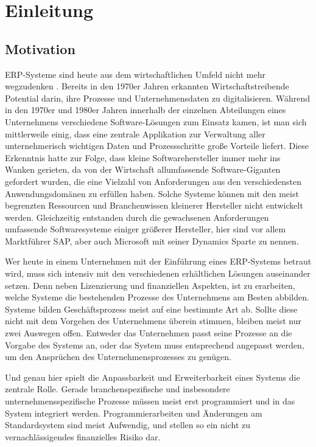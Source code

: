 \chapter{Einleitung}
\label{cha:Einleitung}

\section{Motivation}
\label{sec:Motivation}

ERP-Systeme sind heute aus dem wirtschaftlichen Umfeld nicht mehr wegzudenken \cite{WongTein2003} \cite{DuplagaMarzie2003}. Bereits in den 1970er Jahren erkannten Wirtschaftstreibende Potential darin, ihre Prozesse und Unternehmensdaten zu digitalisieren. Während in den 1970er und 1980er Jahren innerhalb der einzelnen Abteilungen eines Unternehmens verschiedene Software-Lösungen zum Einsatz kamen, ist man sich mittlerweile einig, dass eine zentrale Applikation zur Verwaltung aller unternehmerisch wichtigen Daten und Prozessschritte große Vorteile liefert. Diese Erkenntnis hatte zur Folge, dass kleine Softwarehersteller immer mehr ins Wanken gerieten, da von der Wirtschaft allumfassende Software-Giganten gefordert wurden, die eine Vielzahl von Anforderungen aus den verschiedensten Anwendungsdomänen zu erfüllen haben. Solche Systeme können mit den meist begrenzten Ressourcen und Branchenwissen kleinerer Hersteller nicht entwickelt werden. Gleichzeitig entstanden durch die gewachsenen Anforderungen umfassende Softwaresysteme einiger größerer Hersteller, hier sind vor allem Marktführer SAP, aber auch Microsoft mit seiner Dynamics Sparte zu nennen.

Wer heute in einem Unternehmen mit der Einführung eines ERP-Systems betraut wird, muss sich intensiv mit den verschiedenen erhältlichen Lösungen auseinander setzen\cite{WongTein2003}. Denn neben Lizenzierung und finanziellen Aspekten, ist zu erarbeiten, welche Systeme die bestehenden Prozesse des Unternehmens am Besten abbilden. Systeme bilden Geschäftsprozess meist auf eine bestimmte Art ab. Sollte diese nicht mit dem Vorgehen des Unternehmens überein stimmen, bleiben meist nur zwei Auswegen offen. Entweder das Unternehmen passt seine Prozesse an die Vorgabe des Systems an, oder das System muss entsprechend angepasst werden, um den Ansprüchen des Unternehmensprozesses zu genügen.

Und genau hier spielt die Anpassbarkeit und Erweiterbarkeit eines Systems die zentrale Rolle. Gerade branchenspezifische und insbesondere unternehmensspezifische Prozesse müssen meist erst programmiert und in das System integriert werden. Programmierarbeiten und Änderungen am Standardsystem sind meist Aufwendig, und stellen so ein nicht zu vernachlässigendes finanzielles Risiko dar.

